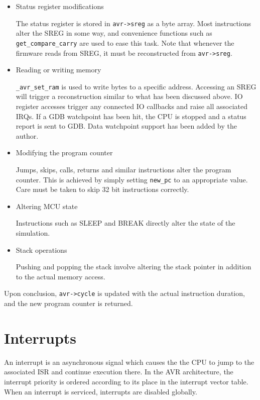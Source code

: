 \begin{itemize}
\item Status register modifications

The status register is stored in \lstinline|avr->sreg| as a byte array.
Most instructions alter the \ac{SREG} in some way, and convenience functions such as
\lstinline|get_compare_carry| are used to ease this task. Note that whenever the
firmware reads from \ac{SREG}, it must be reconstructed from \lstinline|avr->sreg|.

\item Reading or writing memory

\lstinline|_avr_set_ram| is used to write bytes to a specific address. Accessing
an \ac{SREG} will trigger a reconstruction similar to what has been discussed above.
\ac{IO} register accesses trigger any connected \ac{IO} callbacks and raise all associated
\acp{IRQ}. If a \ac{GDB} watchpoint has been hit, the \ac{CPU} is stopped and a status report
is sent to \ac{GDB}. Data watchpoint support has been added by the author.

\item Modifying the program counter

Jumps, skips, calls, returns and similar instructions alter the program counter.
This is achieved by simply setting \lstinline|new_pc| to an appropriate value. Care must be
taken to skip 32 bit instructions correctly.

\item Altering \ac{MCU} state

Instructions such as SLEEP and BREAK directly alter the state of the simulation.

\item Stack operations

Pushing and popping the stack involve altering the stack pointer in addition
to the actual memory access.
\end{itemize}

Upon conclusion, \lstinline|avr->cycle| is updated with the actual instruction
duration, and the new program counter is returned.

\section{Interrupts}

An interrupt is an asynchronous signal which causes the the \ac{CPU} to jump to
the associated \ac{ISR} and continue execution there. In the \ac{AVR} architecture,
the interrupt priority is ordered according to its place in the interrupt
vector table. When an interrupt is serviced, interrupts are disabled globally.

